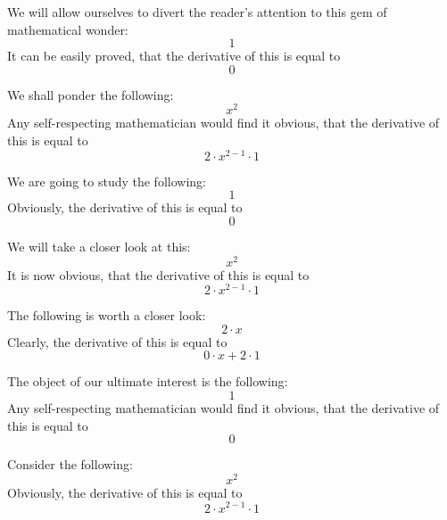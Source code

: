 \documentclass{article}
\begin{document}
We will allow ourselves to divert the reader's attention to this gem of mathematical wonder:
\begin{equation}
1 
\end{equation}
It can be easily proved, that the derivative of this is equal to
\begin{equation}
0 
\end{equation}

We shall ponder the following:
\begin{equation}
x ^{2 } 
\end{equation}
Any self-respecting mathematician would find it obvious, that the derivative of this is equal to
\begin{equation}
2 \cdot x ^{2 - 1 } \cdot 1 
\end{equation}

We are going to study the following:
\begin{equation}
1 
\end{equation}
Obviously, the derivative of this is equal to
\begin{equation}
0 
\end{equation}

We will take a closer look at this:
\begin{equation}
x ^{2 } 
\end{equation}
It is now obvious, that the derivative of this is equal to
\begin{equation}
2 \cdot x ^{2 - 1 } \cdot 1 
\end{equation}

The following is worth a closer look:
\begin{equation}
2 \cdot x 
\end{equation}
Clearly, the derivative of this is equal to
\begin{equation}
0 \cdot x + 2 \cdot 1 
\end{equation}

The object of our ultimate interest is the following:
\begin{equation}
1 
\end{equation}
Any self-respecting mathematician would find it obvious, that the derivative of this is equal to
\begin{equation}
0 
\end{equation}

Consider the following:
\begin{equation}
x ^{2 } 
\end{equation}
Obviously, the derivative of this is equal to
\begin{equation}
2 \cdot x ^{2 - 1 } \cdot 1 
\end{equation}
\end{document}
